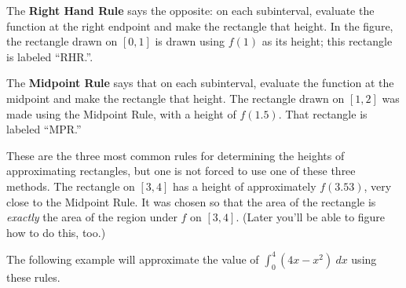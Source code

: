 
The \textbf{Right Hand Rule} says the opposite: on each subinterval, evaluate the function at the right endpoint and make the rectangle that height. In the figure, the rectangle drawn on $[0,1]$ is drawn using $f(1)$ as its height; this rectangle is labeled ``RHR.''.

The \textbf{Midpoint Rule} says that on each subinterval, evaluate the function at the midpoint and make the rectangle that height. The rectangle drawn on $[1,2]$ was made using the Midpoint Rule, with a height of $f(1.5)$. That rectangle is labeled ``MPR.''

These are the three most common rules for determining the heights of approximating rectangles, but one is not forced to use one of these three methods. The rectangle on $[3,4]$ has a height of approximately $f(3.53)$, very close to the Midpoint Rule. It was chosen so that the area of the rectangle is \textit{exactly} the area of the region under $f$ on $[3,4]$. (Later you'll be able to figure how to do this, too.)

The following example will approximate the value of $\int_0^4 (4x-x^2)\ dx$ using these rules.\\


